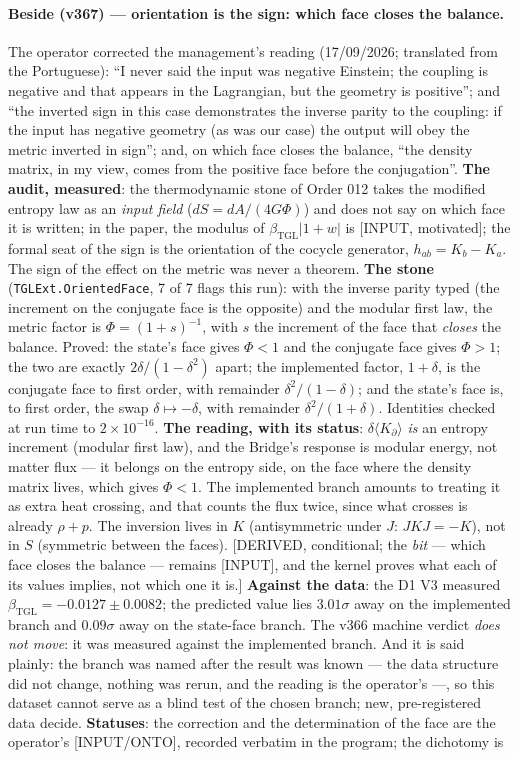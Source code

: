 \documentclass[11pt]{article}
\newcommand{\bTGL}{\beta_{\mathrm{TGL}}}\newcommand{\Msun}{M_{\odot}}\newcommand{\TGL}{\mathrm{TGL}}
\theoremstyle{definition}\newtheorem{deriv}{Derivation}
\begin{document}
\paragraph*{Beside (v367) --- orientation is the sign: which face closes the balance.} The operator corrected the management's reading (17/09/2026; translated from the Portuguese): ``I never said the input was negative Einstein; the coupling is negative and that appears in the Lagrangian, but the geometry is positive''; and ``the inverted sign in this case demonstrates the inverse parity to the coupling: if the input has negative geometry (as was our case) the output will obey the metric inverted in sign''; and, on which face closes the balance, ``the density matrix, in my view, comes from the positive face before the conjugation''. \textbf{The audit, measured}: the thermodynamic stone of Order 012 takes the modified entropy law as an \emph{input field} ($dS=dA/(4G\Phi)$) and does not say on which face it is written; in the paper, the modulus of $\bTGL|1+w|$ is [INPUT, motivated]; the formal seat of the sign is the orientation of the cocycle generator, $h_{ab}=K_b-K_a$. The sign of the effect on the metric was never a theorem. \textbf{The stone} (\texttt{TGLExt.OrientedFace}, 7 of 7 flags this run): with the inverse parity typed (the increment on the conjugate face is the opposite) and the modular first law, the metric factor is $\Phi=(1+s)^{-1}$, with $s$ the increment of the face that \emph{closes} the balance. Proved: the state's face gives $\Phi<1$ and the conjugate face gives $\Phi>1$; the two are exactly $2\delta/(1-\delta^2)$ apart; the implemented factor, $1+\delta$, is the conjugate face to first order, with remainder $\delta^2/(1-\delta)$; and the state's face is, to first order, the swap $\delta\mapsto-\delta$, with remainder $\delta^2/(1+\delta)$. Identities checked at run time to $2\times10^{-16}$. \textbf{The reading, with its status}: $\delta\langle K_\partial\rangle$ \emph{is} an entropy increment (modular first law), and the Bridge's response is modular energy, not matter flux --- it belongs on the entropy side, on the face where the density matrix lives, which gives $\Phi<1$. The implemented branch amounts to treating it as extra heat crossing, and that counts the flux twice, since what crosses is already $\rho+p$. The inversion lives in $K$ (antisymmetric under $J$: $JKJ=-K$), not in $S$ (symmetric between the faces). [DERIVED, conditional; the \emph{bit} --- which face closes the balance --- remains [INPUT], and the kernel proves what each of its values implies, not which one it is.] \textbf{Against the data}: the D1 V3 measured $\bTGL=-0.0127\pm0.0082$; the predicted value lies $3.01\sigma$ away on the implemented branch and $0.09\sigma$ away on the state-face branch. The v366 machine verdict \emph{does not move}: it was measured against the implemented branch. And it is said plainly: the branch was named after the result was known --- the data structure did not change, nothing was rerun, and the reading is the operator's ---, so this dataset cannot serve as a blind test of the chosen branch; new, pre-registered data decide. \textbf{Statuses}: the correction and the determination of the face are the operator's [INPUT/ONTO], recorded verbatim in the program; the dichotomy is 
\end{document}
